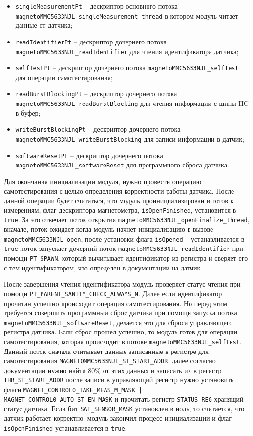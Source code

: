 \begin{itemize}
    \item \lstinline{singleMeasurementPt} -- дескриптор основного потока \lstinline{magnetoMMC5633NJL_singleMeasurement_thread} в котором модуль читает данные от датчика;
    \item \lstinline{readIdentifierPt} -- дескриптор дочернего потока \lstinline{magnetoMMC5633NJL_readIdentifier} для чтения идентификатора датчика;
    \item \lstinline{selfTestPt} --  дескриптор дочернего потока \lstinline{magnetoMMC5633NJL_selfTest} для операции самотестирования;
    \item \lstinline{readBurstBlockingPt} --  дескриптор дочернего потока \lstinline{magnetoMMC5633NJL_readBurstBlocking} для чтения информации с шины IIC в буфер;
    \item \lstinline{writeBurstBlockingPt} --  дескриптор дочернего потока \lstinline{magnetoMMC5633NJL_writeBurstBlocking} для записи информации в датчик;
    \item \lstinline{softwareResetPt} --  дескриптор дочернего потока \lstinline{magnetoMMC5633NJL_softwareReset} для программного сброса датчика.
\end{itemize}

Для окончания инициализации модуля, нужно провести операцию самотестирования с целью определения корректности работы датчика. После данной операции
будет считаться, что модуль проинициализирован и готов к измерениям, флаг дескриптора магнетометра, \lstinline{isOpenFinished}, установится в \lstinline{true}.
За это отвечает поток открытия \lstinline{magnetoMMC5633NJL_openFinalize_thread}, вначале, поток ожидает когда модуль начнет инициализацию в вызове \lstinline{magnetoMMC5633NJL_open},
после установки флага \lstinline{isOpened} -- устанавливается в \lstinline{true} поток запускает дочерний поток \lstinline{magnetoMMC5633NJL_readIdentifier} 
при помощи \lstinline{PT_SPAWN}, который вычитывает идентификатор из регистра и сверяет его с тем идентификатором, что определен в документации на датчик.

После завершения чтения идентификатора модуль проверяет статус чтения при помощи \lstinline{PT_PARENT_SANITY_CHECK_ALWAYS_N}. Далее
если идентификатор прочитан успешно происходит операция самотестирования. Но перед этим требуется совершить программный сброс датчика
при помощи запуска потока \lstinline{magnetoMMC5633NJL_softwareReset},
делается это для сброса управляющего регистра датчика. Если сброс прошел успешно, то модуль готов для операции самотестирования, 
которая происходит в потоке \lstinline{magnetoMMC5633NJL_selfTest}.
Данный поток сначала считывает данные записанные в регистре для самотестирования \lstinline{MAGNETOMMC5633NJL_ST_START_ADDR},
далее согласно документации 
нужно найти 80\% от этих данных и записать их в регистр \lstinline{THR_ST_START_ADDR} после записи в управляющий регистр нужно установить флаги
\lstinline{MAGNET_CONTROL0_TAKE_MEAS_M_MASK | MAGNET_CONTROL0_AUTO_ST_EN_MASK}
и прочитать регистр \lstinline{STATUS_REG} хранящий статус датчика.
Если
бит \lstinline{SAT_SENSOR_MASK} установлен в ноль, то считается,
что датчик работает корректно, модуль закончил процесс инициализации и флаг \lstinline{isOpenFinished} устанавливается в \lstinline{true}.

